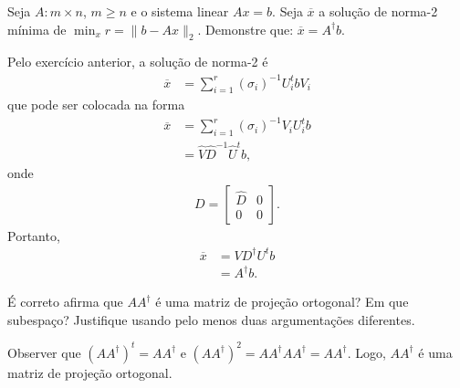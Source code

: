 \documentclass[a4paper,12pt, leqno, answers]{exam}
\begin{document}
\begin{questions}

    \question Seja $A : m \times n$, $m \geq n$ e o sistema linear $A x = b$. Seja $\overline{x}$ a solu\c{c}\~{a}o de norma-2 m\'{i}nima de $\min_x r = \| b - A x \|_2$. Demonstre que: $\overline{x} = A^\dagger b$.
    \begin{solution}
        Pelo exerc\'{i}cio anterior, a solu\c{c}\~{a}o de norma-2 \'{e}
        \begin{align*}
            \overline{x} &= \sum_{i = 1}^r \left( \sigma_i \right)^{-1} U_i^t b V_i
        \end{align*}
        que pode ser colocada na forma
        \begin{align*}
            \overline{x} &= \sum_{i = 1}^r \left( \sigma_i \right)^{-1} V_i U_i^t b \\
            &= \hat{V} \hat{D}^{-1} \hat{U}^t b,
        \end{align*}
        onde
        \begin{align*}
            D = \begin{bmatrix}
                \hat{D} & 0 \\
                0 & 0
            \end{bmatrix}.
        \end{align*}
        Portanto,
        \begin{align*}
            \overline{x} &= V D^\dagger U^t b \\
            &= A^\dagger b.
        \end{align*}
    \end{solution}

    \question \'{E} correto afirma que $A A^\dagger$ \'{e} uma matriz de proje\c{c}\~{a}o ortogonal? Em que subespa\c{c}o? Justifique usando pelo menos duas argumenta\c{c}\~{o}es diferentes.
    \begin{solution}
        Observer que $\left( A A^\dagger \right)^t = A A^\dagger$ e $\left( A A^\dagger \right)^2 = A A^\dagger A A^\dagger = A A^\dagger$. Logo, $A A^\dagger$ \'{e} uma matriz de proje\c{c}\~{a}o ortogonal.


\end{solution}
\end{questions}
\end{document}
